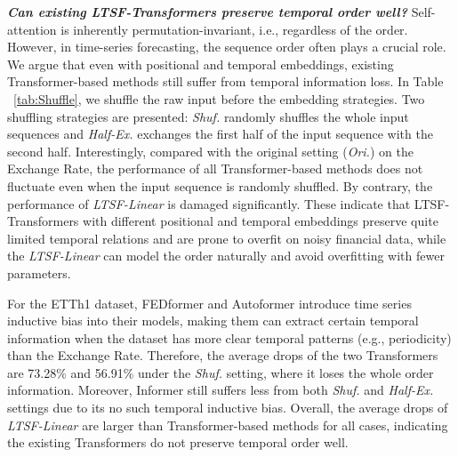 \documentclass[10pt,twocolumn,letterpaper]{article}
\newcommand{\modelname}{\emph{LTSF-Linear}\xspace}
\begin{document}
\textbf{\emph{Can existing LTSF-Transformers preserve temporal order well?}}
Self-attention is inherently permutation-invariant, i.e., regardless of the order. However, in time-series forecasting, the sequence order often plays a crucial role. We argue that even with positional and temporal embeddings, existing Transformer-based methods still suffer from temporal information loss. In Table ~\ref{tab:Shuffle}, we shuffle the raw input before the embedding strategies. Two shuffling strategies are presented: \emph{Shuf.} randomly shuffles the whole input sequences and \emph{Half-Ex.} exchanges the first half of the input sequence with the second half.
Interestingly, compared with the original setting (\emph{Ori.}) on the Exchange Rate, the performance of all Transformer-based methods does not fluctuate even when the input sequence is randomly shuffled. By contrary, the performance of \modelname is damaged significantly. These indicate that LTSF-Transformers with different positional and temporal embeddings preserve quite limited temporal relations and are prone to overfit on noisy financial data, while the \modelname can model the order naturally and avoid overfitting with fewer parameters. 


For the ETTh1 dataset, FEDformer and Autoformer introduce time series inductive bias into their models, making them can extract certain temporal information when the dataset has more clear temporal patterns (e.g., periodicity) than the Exchange Rate. Therefore, the average drops of the two Transformers are 73.28\% and 56.91\% under the \emph{Shuf.} setting, where it loses the whole order information. Moreover, Informer still suffers less from both \emph{Shuf.} and \emph{Half-Ex.} settings due to its no such temporal inductive bias. Overall, the average drops of \modelname are larger than Transformer-based methods for all cases, indicating the existing Transformers do not preserve temporal order well.
\end{document}
